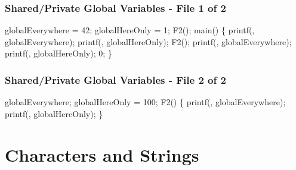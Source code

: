 \documentclass[smaller,table]{beamer} %
\begin{document}
\begin{frame}[fragile]
\frametitle{Shared/Private Global Variables - File 1 of 2}
\begin{semiverbatim}
\footnotesize
\kr\kl{} 
\kl
\kl{} globalEverywhere = 42;
\kl{} globalHereOnly = 1;
\kl
\kl{} F2(); 
\kl
\kl{} main()
\kl\{
\kl   printf(, globalEverywhere);
\kl   printf(, globalHereOnly);
\kl
\kl   F2();
\kl
\kl   printf(, globalEverywhere);
\kl   printf(, globalHereOnly);
\kl
\kl   {} 0;
\kl\}
\end{semiverbatim}
\end{frame}

\begin{frame}[fragile]
\frametitle{Shared/Private Global Variables - File 2 of 2}
\vspace{-0.1in}
\begin{semiverbatim}
\small
\kr\kl{} 
\kl
\kl{} globalEverywhere;
\kl{}
\kl
\kl{} globalHereOnly = 100;
\kl
\kl{} F2()
\kl\{
\kl   printf(,
\kl                 globalEverywhere);
\kl                 
\kl   printf(,
\kl                 globalHereOnly);
\kl\}
\end{semiverbatim}
\end{frame}

\section{Characters and Strings}
\end{document}
